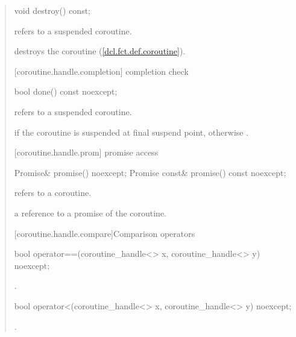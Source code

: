 \begin{quote}
\begin{itemdecl}
  void destroy() const;
\end{itemdecl}
\begin{itemdescr}
  \pnum
  \precondition {} refers to a suspended coroutine.
  
  \pnum
  \effects destroys the coroutine (\ref{dcl.fct.def.coroutine}).
\end{itemdescr}

[coroutine.handle.completion]{ completion check}
\begin{itemdecl}
  bool done() const noexcept; 
\end{itemdecl}
\begin{itemdescr}
  \pnum
  \precondition {} refers to a suspended coroutine.
  
  \pnum
  \returns {} if the coroutine is suspended
  at final suspend point, otherwise .
\end{itemdescr}

[coroutine.handle.prom]{ promise access}
\begin{itemdecl}
  Promise& promise() noexcept;		
  Promise const& promise() const noexcept;
\end{itemdecl}

\begin{itemdescr}
  \pnum
  \precondition {} refers to a coroutine.
  
  \pnum
  \returns a reference to a promise of the coroutine.
\end{itemdescr}

[coroutine.handle.compare]{Comparison operators}

\begin{itemdecl}
  bool operator==(coroutine_handle<> x, coroutine_handle<> y) noexcept;
\end{itemdecl}

\begin{itemdescr}
  \pnum
  \returns {}.
\end{itemdescr}

\begin{itemdecl}
  bool operator<(coroutine_handle<> x, coroutine_handle<> y) noexcept;
\end{itemdecl}

\begin{itemdescr}
  \pnum
  \returns {}.
\end{itemdescr}


\end{quote}
